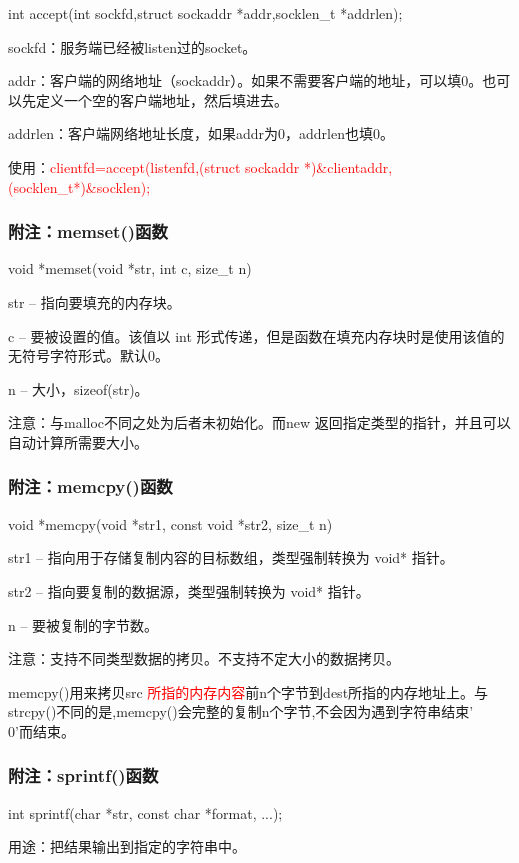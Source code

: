 \documentclass[UTF8]{article}%
\begin{document}
int accept(int sockfd,struct sockaddr *addr,socklen\_t *addrlen);

sockfd：服务端已经被listen过的socket。

addr：客户端的网络地址（sockaddr）。如果不需要客户端的地址，可以填0。也可以先定义一个空的客户端地址，然后填进去。

addrlen：客户端网络地址长度，如果addr为0，addrlen也填0。

使用：\textcolor{red}{clientfd=accept(listenfd,(struct sockaddr *)\&clientaddr,(socklen\_t*)\&socklen);}

\subsubsection{附注：memset()函数}

void *memset(void *str, int c, size\_t n)

str -- 指向要填充的内存块。

c -- 要被设置的值。该值以 int 形式传递，但是函数在填充内存块时是使用该值的无符号字符形式。默认0。

n -- 大小，sizeof(str)。

注意：与malloc不同之处为后者未初始化。而new 返回指定类型的指针，并且可以自动计算所需要大小。

\subsubsection{附注：memcpy()函数}

void *memcpy(void *str1, const void *str2, size\_t n)

str1 -- 指向用于存储复制内容的目标数组，类型强制转换为 void* 指针。

str2 -- 指向要复制的数据源，类型强制转换为 void* 指针。

n -- 要被复制的字节数。

注意：支持不同类型数据的拷贝。不支持不定大小的数据拷贝。

memcpy()用来拷贝src \textcolor{red}{所指的内存内容}前n个字节到dest所指的内存地址上。与strcpy()不同的是,memcpy()会完整的复制n个字节,不会因为遇到字符串结束'\\0'而结束。

\subsubsection{附注：sprintf()函数}

int sprintf(char *str, const char *format, ...);

用途：把结果输出到指定的字符串中。
\end{document}
